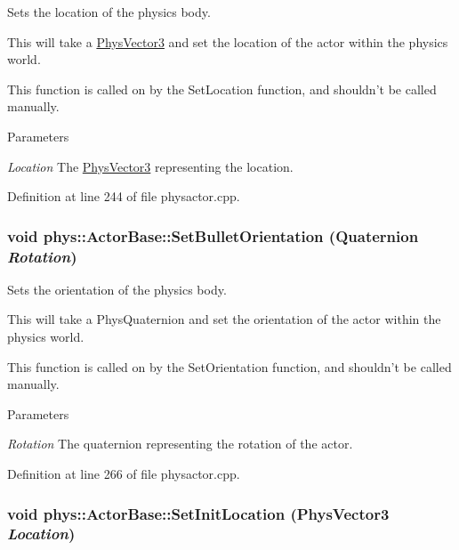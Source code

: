 Sets the location of the physics body. 

This will take a \hyperlink{classPhysVector3}{PhysVector3} and set the location of the actor within the physics world. \par
 This function is called on by the SetLocation function, and shouldn't be called manually. 
\begin{DoxyParams}{Parameters}
\item[{\em Location}]The \hyperlink{classPhysVector3}{PhysVector3} representing the location. \end{DoxyParams}


Definition at line 244 of file physactor.cpp.

\hypertarget{classphys_1_1ActorBase_a492244ac46ced53b809f436da992bc84}{
\subsubsection[{SetBulletOrientation}]{\setlength{\rightskip}{0pt plus 5cm}void phys::ActorBase::SetBulletOrientation ({\bf Quaternion} {\em Rotation})}}
\label{d8/d0f/classphys_1_1ActorBase_a492244ac46ced53b809f436da992bc84}


Sets the orientation of the physics body. 

This will take a PhysQuaternion and set the orientation of the actor within the physics world. \par
 This function is called on by the SetOrientation function, and shouldn't be called manually. 
\begin{DoxyParams}{Parameters}
\item[{\em Rotation}]The quaternion representing the rotation of the actor. \end{DoxyParams}


Definition at line 266 of file physactor.cpp.

\hypertarget{classphys_1_1ActorBase_ab7513e8b650b40ea4387c170929457a7}{
\subsubsection[{SetInitLocation}]{\setlength{\rightskip}{0pt plus 5cm}void phys::ActorBase::SetInitLocation ({\bf PhysVector3} {\em Location})}}
\label{d8/d0f/classphys_1_1ActorBase_ab7513e8b650b40ea4387c170929457a7}



